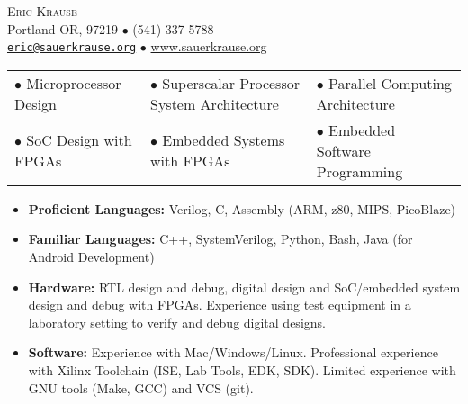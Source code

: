 \documentclass{article}
\begin{document}
\fancyhf{}

\vspace*{-.5in} %

\begin{center}
	{\LARGE \scshape {Eric Krause}}	\\
	Portland OR, 97219  $\bullet$ (541) 337-5788\\
	\texttt{\href{mailto:eric@sauerkrause.org}{eric@sauerkrause.org}}
  $\bullet$  \url{www.sauerkrause.org}\\
\end{center}



	\hspace{-4pt}


	
	
	\vspace{-5pt}


	\begin{table}[h!]\centering
	\small\vspace{-8pt}
	\begin{tabular}{lll}
	$\bullet$ Microprocessor Design & $\bullet$ Superscalar Processor System Architecture & $\bullet$ Parallel Computing Architecture\\
	$\bullet$ SoC Design with FPGAs & $\bullet$ Embedded Systems with FPGAs & $\bullet$ Embedded Software Programming\\
	\end{tabular}
	\vspace{-17pt}
\end{table}	


 \vspace{-6pt}
	\begin{itemize}\setlength{\itemsep}{-4pt}

		\item\textbf{Proficient Languages:} Verilog, C, Assembly (ARM, z80, MIPS, PicoBlaze)
		\item\textbf{Familiar Languages:} C++, SystemVerilog, Python, Bash, Java (for Android Development)
		\item\textbf{Hardware:} RTL design and debug, digital design and SoC/embedded system design and debug with FPGAs.  Experience using test equipment in a laboratory setting to verify and debug digital designs.
		\item\textbf{Software:} Experience with Mac/Windows/Linux.  Professional experience with Xilinx Toolchain (ISE, Lab Tools, EDK, SDK).  Limited experience with GNU tools (Make, GCC) and VCS (git).
	\end{itemize}
	\vspace{-8pt}
\end{document}
